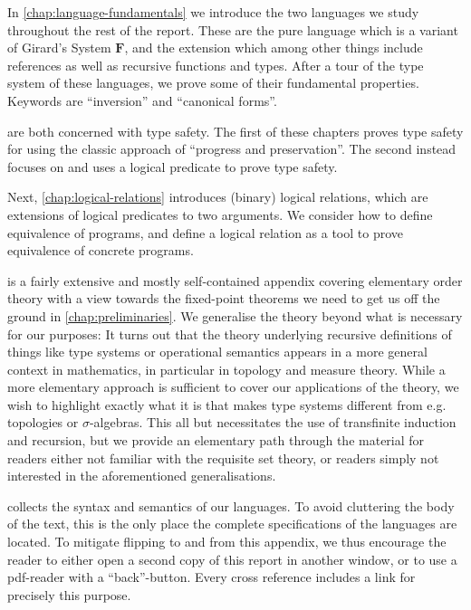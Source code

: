 In \cref{chap:language-fundamentals} we introduce the two languages we study throughout the rest of the report. These are the pure language \langpure{} which is a variant of Girard's System $\mathbf{F}$, and the extension \langrecref{} which among other things include references as well as recursive functions and types. After a tour of the type system of these languages, we prove some of their fundamental properties. Keywords are \enquote{inversion} and \enquote{canonical forms}.

 are both concerned with type safety. The first of these chapters proves type safety for \langrecref{} using the classic approach of \enquote{progress and preservation}. The second instead focuses on \langpure{} and uses a logical predicate to prove type safety.

Next, \cref{chap:logical-relations} introduces (binary) logical relations, which are extensions of logical predicates to two arguments. We consider how to define equivalence of programs, and define a logical relation as a tool to prove equivalence of concrete programs.

 is a fairly extensive and mostly self-contained appendix covering elementary order theory with a view towards the fixed-point theorems we need to get us off the ground in \cref{chap:preliminaries}. We generalise the theory beyond what is necessary for our purposes: It turns out that the theory underlying recursive definitions of things like type systems or operational semantics appears in a more general context in mathematics, in particular in topology and measure theory. While a more elementary approach is sufficient to cover our applications of the theory, we wish to highlight exactly what it is that makes type systems different from e.g. topologies or $\sigma$-algebras. This all but necessitates the use of transfinite induction and recursion, but we provide an elementary path through the material for readers either not familiar with the requisite set theory, or readers simply not interested in the aforementioned generalisations.

 collects the syntax and semantics of our languages. To avoid cluttering the body of the text, this is the only place the complete specifications of the languages are located. To mitigate flipping to and from this appendix, we thus encourage the reader to either open a second copy of this report in another window, or to use a pdf-reader with a \enquote{back}-button. Every cross reference includes a link for precisely this purpose.

